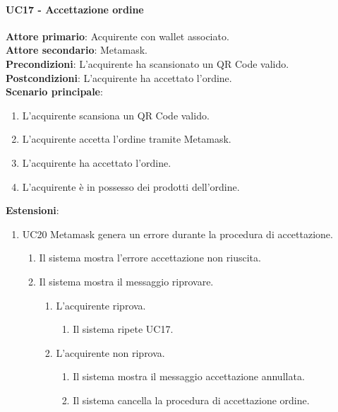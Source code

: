 \documentclass[a4paper, 12pt]{article}
\begin{document}
\paragraph{UC17 - Accettazione ordine}
\textbf{Attore primario}: Acquirente con wallet associato.\\
\textbf{Attore secondario}: Metamask.\\
\textbf{Precondizioni}: L'acquirente ha scansionato un QR Code valido.\\
\textbf{Postcondizioni}: L'acquirente ha accettato l'ordine.\\
\textbf{Scenario principale}:
\begin{enumerate}
    \item L'acquirente scansiona un QR Code valido.
    \item L'acquirente accetta l'ordine tramite Metamask.
    \item L'acquirente ha accettato l'ordine.
    \item L'acquirente è in possesso dei prodotti dell'ordine.
\end{enumerate}
\textbf{Estensioni}:
\begin{enumerate}
    \item UC20 Metamask genera un errore durante la procedura di accettazione.
    \begin{enumerate}
        \item Il sistema mostra l'errore accettazione non riuscita.
        \item Il sistema mostra il messaggio riprovare.
        \begin{enumerate}
            \item L'acquirente riprova.
            \begin{enumerate}
                \item Il sistema ripete UC17.
            \end{enumerate}
            \item L'acquirente non riprova.
            \begin{enumerate}
                \item Il sistema mostra il messaggio accettazione annullata.
                \item Il sistema cancella la procedura di accettazione ordine.
            \end{enumerate}
        \end{enumerate}
    \end{enumerate}
\end{enumerate}
\end{document}
